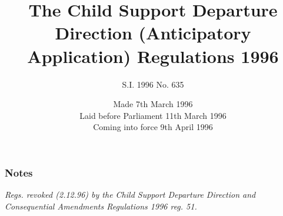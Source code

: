 \documentclass[a4paper]{article}
\title{The Child Support Departure Direction (Anticipatory Application) Regulations 1996}
\author{S.I. 1996 No. 635}
\date{Made 7th March 1996\\Laid before Parliament 11th March 1996\\Coming into force 9th April 1996
}
\newcommand{\parthead}{}
\newcommand\amendment[1]{\subsubsection*{Notes}{\itshape\frenchspacing\footnotesize #1 \par}}
\begin{document}
\maketitle

\amendment{
Regs. revoked (2.12.96) by the Child Support Departure Direction and Consequential Amendments Regulations 1996 reg. 51.
}

%
%
%
%
%
%
%
%
%
%
%
%
%
\end{document}
